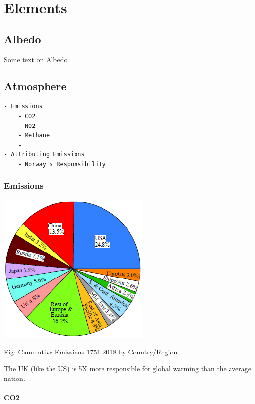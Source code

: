 \documentclass[
]{book}
\begin{document}
\hypertarget{part-elements}{%
\part{Elements}\label{part-elements}}

\hypertarget{albedo}{%
\chapter{Albedo}\label{albedo}}

Some text on Albedo

\hypertarget{atmosphere}{%
\chapter{Atmosphere}\label{atmosphere}}

\begin{verbatim}
- Emissions
    - CO2
    - NO2   
    - Methane
    -
- Attributing Emissions
    - Norway's Responsibility
\end{verbatim}

\hypertarget{emissions}{%
\section{Emissions}\label{emissions}}

\includegraphics{fig/Emissions_Sum_1751-2018_by_Region.png}

Fig: Cumulative Emissions 1751-2018 by Country/Region

The UK (like the US) is 5X more responsible for global warming than the average nation.

\hypertarget{co2}{%
\subsection{CO2}\label{co2}}
\end{document}
